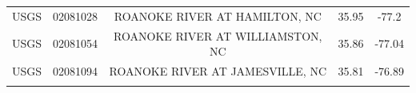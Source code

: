 \documentclass[12pt,]{article}
\begin{document}
\begin{longtable}[]{@{}ccccc@{}}
\begin{minipage}[t]{0.10\columnwidth}\centering\strut
USGS\strut
\end{minipage} & \begin{minipage}[t]{0.15\columnwidth}\centering\strut
02081028\strut
\end{minipage} & \begin{minipage}[t]{0.36\columnwidth}\centering\strut
ROANOKE RIVER AT HAMILTON, NC\strut
\end{minipage} & \begin{minipage}[t]{0.12\columnwidth}\centering\strut
35.95\strut
\end{minipage} & \begin{minipage}[t]{0.12\columnwidth}\centering\strut
-77.2\strut
\end{minipage}\tabularnewline
\begin{minipage}[t]{0.10\columnwidth}\centering\strut
USGS\strut
\end{minipage} & \begin{minipage}[t]{0.15\columnwidth}\centering\strut
02081054\strut
\end{minipage} & \begin{minipage}[t]{0.36\columnwidth}\centering\strut
ROANOKE RIVER AT WILLIAMSTON, NC\strut
\end{minipage} & \begin{minipage}[t]{0.12\columnwidth}\centering\strut
35.86\strut
\end{minipage} & \begin{minipage}[t]{0.12\columnwidth}\centering\strut
-77.04\strut
\end{minipage}\tabularnewline
\begin{minipage}[t]{0.10\columnwidth}\centering\strut
USGS\strut
\end{minipage} & \begin{minipage}[t]{0.15\columnwidth}\centering\strut
02081094\strut
\end{minipage} & \begin{minipage}[t]{0.36\columnwidth}\centering\strut
ROANOKE RIVER AT JAMESVILLE, NC\strut
\end{minipage} & \begin{minipage}[t]{0.12\columnwidth}\centering\strut
35.81\strut
\end{minipage} & \begin{minipage}[t]{0.12\columnwidth}\centering\strut
-76.89\strut
\end{minipage}\tabularnewline
\begin{minipage}[t]{0.10\columnwidth}\centering\strut

\end{minipage}
\end{longtable}
\end{document}
